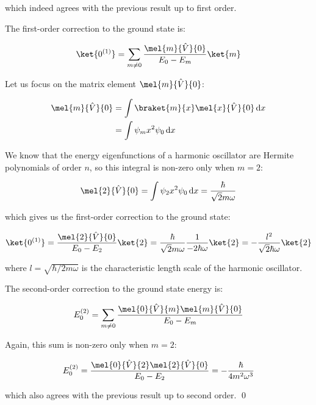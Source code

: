 \documentclass[12pt]{article}
\begin{document}
which indeed agrees with the previous result up to first order.

The first-order correction to the ground state is:

\begin{equation}
    \ket{0^{(1)}} = \sum_{m \ne 0} \frac{\mel{m}{\hat{V}}{0}}{E_{0} - E_{m}} \ket{m}
\end{equation}

Let us focus on the matrix element $\mel{m}{\hat{V}}{0}$:

\begin{equation}
    \begin{split}
        \mel{m}{\hat{V}}{0} &= \int \braket{m}{x} \mel{x}{\hat{V}}{0} \, \mathrm{d}x \\
        &= \int \psi_{m} x^{2} \psi_{0} \, \mathrm{d}x
    \end{split}
\end{equation}

We know that the energy eigenfunctions of a harmonic oscillator are Hermite polynomials of order $n$, so this integral is non-zero only when $m = 2$:

\begin{equation}
    \mel{2}{\hat{V}}{0} = \int \psi_{2} x^{2} \psi_{0} \, \mathrm{d}x = \frac{\hbar}{\sqrt{2}m\omega}
\end{equation}

which gives us the first-order correction to the ground state:

\begin{equation}
    \ket{0^{(1)}} = \frac{\mel{2}{\hat{V}}{0}}{E_{0} - E_{2}} \ket{2} = \frac{\hbar}{\sqrt{2}m\omega} \frac{1}{-2\hbar\omega} \ket{2} = -\frac{l^{2}}{\sqrt{2}\hbar \omega} \ket{2}
\end{equation}

where $l = \sqrt{\hbar/2m\omega}$ is the characteristic length scale of the harmonic oscillator.

The second-order correction to the ground state energy is:

\begin{equation}
    E_{0}^{(2)} = \sum_{m \ne 0} \frac{\mel{0}{\hat{V}}{m} \mel{m}{\hat{V}}{0}}{E_{0} - E_{m}}
\end{equation}

Again, this sum is non-zero only when $m = 2$:

\begin{equation}
    E_{0}^{(2)} = \frac{\mel{0}{\hat{V}}{2} \mel{2}{\hat{V}}{0}}{E_{0} - E_{2}} = -\frac{\hbar}{4m^{2}\omega^{3}}
\end{equation}

which also agrees with the previous result up to second order.
\qed


\end{document}
